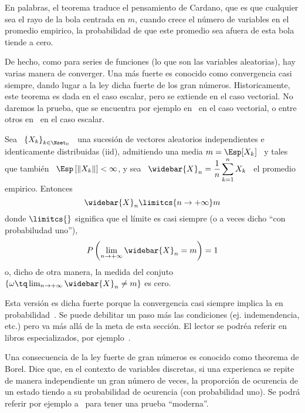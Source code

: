En palabras, el teorema traduce el  pensamiento de Cardano, que es que cualquier
sea el rayo de la bola centrada en $m$, cuando crece el n\'umero de variables en
el promedio  empirico, la probabilidad de  que este promedio sea  afuera de esta
bola tiende a cero.

De hecho, como  para series de funciones (lo que  son las variables aleatorias),
hay varias manera  de converger. Una m\'as fuerte  es conocido como convergencia
casi  siempre,  dando  lugar a  la  ley  dicha  fuerte  de los  gran  n\'umeros.
Historicamente, este teorema es dada en  el caso escalar, pero se extiende en el
caso  vectorial.    No  daremos  la   prueba,  que  se  encuentra   por  ejemplo
en~\cite[Teo.~6.4.2]{Gre63}    en   el   caso    vectorial,   o    entre   otros
en~\cite[Teo.~22.1]{Bil12} en el caso escalar.
%
\begin{teorema}
%
  Sea  \ $\left\{ X_k  \right\}_{k \in  \Nset_0}$ \  una sucesi\'on  de vectores
  aleatorios independientes  e identicamente distribuidas  (iid), admitiendo una
  media  $m =  \Esp[X_k]$ \  y  tales que  tambi\'en \  $\Esp\left[ \left\|  X_k
    \right\| \right] <  \infty$, y sea \ $\displaystyle  \widebar{X}_n = \frac1n
  \sum_{k=1}^n X_k$ \ el promedio empirico. Entonces
  \[
  \widebar{X}_n \limitcs{n \to +\infty} m
  \]
  donde $\limitcs{}$ significa que el l\'imite  es casi siempre (o a veces dicho
  ``con probabiludad uno''), \ie
  \[
  P\left(    \lim_{n \to +\infty}   \widebar{X}_n =  m \right) = 1
  \]
  o, dicho  de otra  manera, la medida  del conjuto  $\{ \omega \tq  \lim_{n \to
    +\infty} \widebar{X}_n \ne m \}$ es cero.
\end{teorema}
%

Esta versi\'on es dicha fuerte porque la convergencia casi siempre implica la en
probabilidad~\cite{Fel71, Shi84, AshDol99, JacPro03, AthLah06, Bil12, Coh13}. Se
puede debilitar un paso m\'as  las condiciones (ej. indemendencia, etc.) pero va
m\'as all\'a  de la  meta de esta  secci\'on. El  lector se podr\'ea  referir en
libros  especializados,  por  ejemplo~\cite{Fel71,  Shi84,  AshDol99,  JacPro03,
  AthLah06, Bil12, Coh13}.

Una consecuencia de la ley fuerte de gran n\'umeros es conocido como theorema de
Borel. Dice  que, en el  contexto de variables  discretas, si una  experienca se
repite de  manera independiente  un gran n\'umero  de veces, la  proporci\'on de
ocurencia de un  estado tiendo a su probabilidad  de ocurencia (con probabilidad
uno).  Se podr\'a  referir  por  ejemplo a~\cite{Wen91}  para  tener una  prueba
``moderna''.

